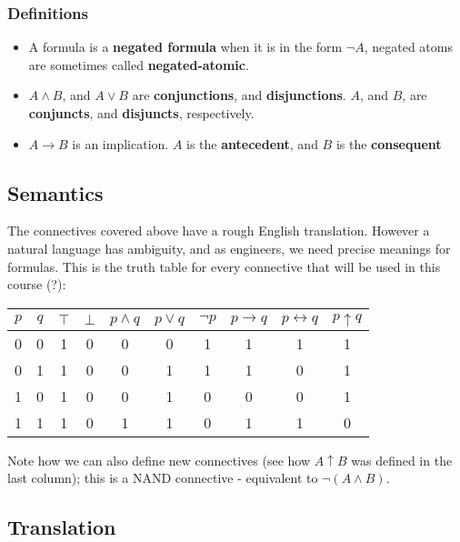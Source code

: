 \documentclass[a4paper, 12pt]{article}
\begin{document}
            \subsubsection*{Definitions}
                \begin{itemize}
                    \itemsep0em
                    \item A formula is a \textbf{negated formula} when it is in the form $\neg A$, negated atoms are sometimes called \textbf{negated-atomic}.
                    \item $A \land B$, and $A \lor B$ are \textbf{conjunctions}, and \textbf{disjunctions}. $A$, and $B$, are \textbf{conjuncts}, and \textbf{disjuncts}, respectively.
                    \item $A \rightarrow B$ is an implication. $A$ is the \textbf{antecedent}, and $B$ is the \textbf{consequent}
                \end{itemize}
        \subsection*{Semantics}
            The connectives covered above have a rough English translation. However a natural language has ambiguity, and as engineers, we need precise meanings for formulas. This is the truth table for every connective that will be used in this course (?):
            \begin{center}
                \begin{tabular}{||c|c||c|c|c|c|c|c|c||c||}
                    \hline
                    $p$ & $q$ & $\top$ & $\bot$ & $p \land q$ & $p \lor q$ & $\neg p$ & $p \rightarrow q$ & $p \leftrightarrow q$ & $p \uparrow q$ \\
                    \hline
                    0 & 0 & 1 & 0 & 0 & 0 & 1 & 1 & 1 & 1\\
                    0 & 1 & 1 & 0 & 0 & 1 & 1 & 1 & 0 & 1\\
                    1 & 0 & 1 & 0 & 0 & 1 & 0 & 0 & 0 & 1\\
                    1 & 1 & 1 & 0 & 1 & 1 & 0 & 1 & 1 & 0\\
                    \hline
                \end{tabular}
            \end{center}
            Note how we can also define new connectives (see how $A \uparrow B$ was defined in the last column); this is a NAND connective - equivalent to $\neg (A \land B)$.
        \subsection*{Translation}
\end{document}
